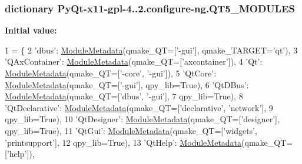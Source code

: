 \subsubsection[{Q\+T5\+\_\+\+M\+O\+D\+U\+L\+E\+S}]{\setlength{\rightskip}{0pt plus 5cm}dictionary Py\+Qt-\/x11-\/gpl-\/4..\+2.configure-\/ng.\+Q\+T5\+\_\+\+M\+O\+D\+U\+L\+E\+S}\label{namespacePyQt-x11-gpl-4_811_82_1_1configure-ng_a6bbef627eb3e6031eedc9483a2d5d5c9}
{\bfseries Initial value\+:}
\begin{DoxyCode}
1 = \{
2     \textcolor{stringliteral}{'dbus'}:             \hyperlink{classPyQt-x11-gpl-4_811_82_1_1configure-ng_1_1ModuleMetadata}{ModuleMetadata}(qmake\_QT=[\textcolor{stringliteral}{'-gui'}], qmake\_TARGET=\textcolor{stringliteral}{'qt'}),
3     \textcolor{stringliteral}{'QAxContainer'}:     \hyperlink{classPyQt-x11-gpl-4_811_82_1_1configure-ng_1_1ModuleMetadata}{ModuleMetadata}(qmake\_QT=[\textcolor{stringliteral}{'axcontainer'}]),
4     \textcolor{stringliteral}{'Qt'}:               \hyperlink{classPyQt-x11-gpl-4_811_82_1_1configure-ng_1_1ModuleMetadata}{ModuleMetadata}(qmake\_QT=[\textcolor{stringliteral}{'-core'}, \textcolor{stringliteral}{'-gui'}]),
5     \textcolor{stringliteral}{'QtCore'}:           \hyperlink{classPyQt-x11-gpl-4_811_82_1_1configure-ng_1_1ModuleMetadata}{ModuleMetadata}(qmake\_QT=[\textcolor{stringliteral}{'-gui'}], qpy\_lib=\textcolor{keyword}{True}),
6     \textcolor{stringliteral}{'QtDBus'}:           \hyperlink{classPyQt-x11-gpl-4_811_82_1_1configure-ng_1_1ModuleMetadata}{ModuleMetadata}(qmake\_QT=[\textcolor{stringliteral}{'dbus'}, \textcolor{stringliteral}{'-gui'}],
7                                 qpy\_lib=\textcolor{keyword}{True}),
8     \textcolor{stringliteral}{'QtDeclarative'}:    \hyperlink{classPyQt-x11-gpl-4_811_82_1_1configure-ng_1_1ModuleMetadata}{ModuleMetadata}(qmake\_QT=[\textcolor{stringliteral}{'declarative'}, \textcolor{stringliteral}{'network'}],
9                                 qpy\_lib=\textcolor{keyword}{True}),
10     \textcolor{stringliteral}{'QtDesigner'}:       \hyperlink{classPyQt-x11-gpl-4_811_82_1_1configure-ng_1_1ModuleMetadata}{ModuleMetadata}(qmake\_QT=[\textcolor{stringliteral}{'designer'}], qpy\_lib=\textcolor{keyword}{True}),
11     \textcolor{stringliteral}{'QtGui'}:            \hyperlink{classPyQt-x11-gpl-4_811_82_1_1configure-ng_1_1ModuleMetadata}{ModuleMetadata}(qmake\_QT=[\textcolor{stringliteral}{'widgets'}, \textcolor{stringliteral}{'printsupport'}],
12                                 qpy\_lib=\textcolor{keyword}{True}),
13     \textcolor{stringliteral}{'QtHelp'}:           \hyperlink{classPyQt-x11-gpl-4_811_82_1_1configure-ng_1_1ModuleMetadata}{ModuleMetadata}(qmake\_QT=[\textcolor{stringliteral}{'help'}]),

\end{DoxyCode}
